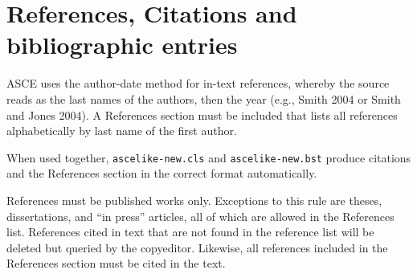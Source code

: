 \documentclass[NewProceedings,letterpaper]{ascelike-new}
\begin{document}
\section{References, Citations and bibliographic entries}

ASCE uses the author-date method for in-text references, whereby the source reads as the last names of the authors, then the year (e.g., Smith 2004 or Smith and Jones 2004). A References section must be included that lists all references alphabetically by last name of the first author.

When used together, \texttt{ascelike-new.cls} and \texttt{ascelike-new.bst} produce citations and the References section in the correct format automatically.

References must be published works only. Exceptions to this rule are theses, dissertations, and ``in press'' articles, all of which are allowed in the References list. References cited in text that are not found in the reference list will be deleted but queried by the copyeditor. Likewise, all references included in the References section must be cited in the text.
\end{document}
